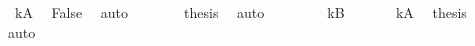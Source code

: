 \begin{isabellebody}
\begin{exercise}[subtitle=Logčki lavirinti.]
\ {\isacartoucheopen}{\isasymnot}\ kA{\isacartoucheclose}\ \isamarkupfalse%
\ False\ \isamarkupfalse%
\ auto\isanewline
\ \ \ \ \isamarkupfalse%
\ \isamarkupfalse%
\ {\isacharquery}{\kern0pt}thesis\ \isamarkupfalse%
\ auto\isanewline
\ \ \isamarkupfalse%
\isanewline
\ \ \ \ \isamarkupfalse%
\ kB\isanewline
\ \ \ \ \isamarkupfalse%
\ {\isacartoucheopen}{\isasymnot}\ kA{\isacartoucheclose}\ \isamarkupfalse%
\ {\isacharquery}{\kern0pt}thesis\ \isamarkupfalse%
\ auto\isanewline
\ \ \isamarkupfalse%
\isanewline
{}\isamarkupfalse%
%
\endisatagproof
{\isafoldproof}%
%
\isadelimproof
%
\endisadelimproof
%
\end{exercise}
%
\isadelimtheory
%
\endisadelimtheory
%
\isatagtheory
%
\endisatagtheory
{\isafoldtheory}%
%
\isadelimtheory
%
\endisadelimtheory
%
\end{isabellebody}%
\endinput
